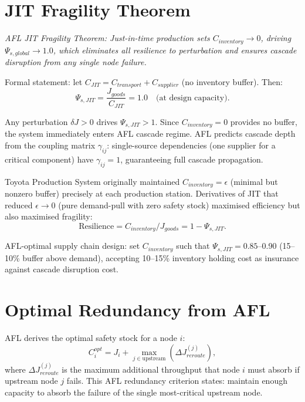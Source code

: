 \documentclass[11pt]{article}
\begin{document}
\section{JIT Fragility Theorem}

\begin{center}
\textit{AFL JIT Fragility Theorem: Just-in-time production sets $C_{inventory} \to 0$,
driving $\Psi_{s,global} \to 1.0$, which eliminates all resilience to perturbation and ensures
cascade disruption from any single node failure.}
\end{center}

Formal statement: let $C_{JIT} = C_{transport} + C_{supplier}$ (no inventory buffer). Then:
\begin{equation}
\Psi_{s,JIT} = \frac{J_{goods}}{C_{JIT}} = 1.0 \quad \text{(at design capacity)}.
\end{equation}

Any perturbation $\delta J > 0$ drives $\Psi_{s,JIT} > 1$. Since $C_{inventory} = 0$ provides
no buffer, the system immediately enters AFL cascade regime. AFL predicts cascade depth from
the coupling matrix $\gamma_{ij}$: single-source dependencies (one supplier for a critical
component) have $\gamma_{ij} = 1$, guaranteeing full cascade propagation.

Toyota Production System originally maintained $C_{inventory} = \epsilon$ (minimal but nonzero
buffer) precisely at each production station. Derivatives of JIT that reduced $\epsilon \to 0$
(pure demand-pull with zero safety stock) maximised efficiency but also maximised fragility:
\begin{equation}
\text{Resilience} = C_{inventory} / J_{goods} = 1 - \Psi_{s,JIT}.
\end{equation}

AFL-optimal supply chain design: set $C_{inventory}$ such that $\Psi_{s,JIT} = 0.85$--0.90
(15--10\% buffer above demand), accepting 10--15\% inventory holding cost as insurance against
cascade disruption cost.

\section{Optimal Redundancy from AFL}

AFL derives the optimal safety stock for a node $i$:
\begin{equation}
C_{i}^{opt} = J_i + \max_{j \in \text{upstream}}\left(\Delta J_{reroute}^{(j)}\right),
\end{equation}
where $\Delta J_{reroute}^{(j)}$ is the maximum additional throughput that node $i$ must absorb
if upstream node $j$ fails. This AFL redundancy criterion states: maintain enough capacity to
absorb the failure of the single most-critical upstream node.
\end{document}
